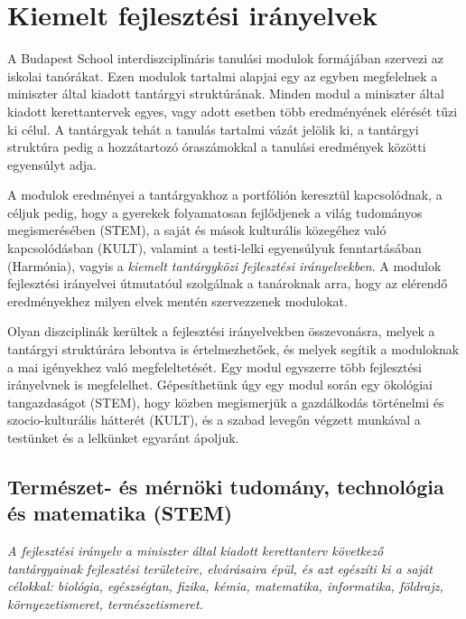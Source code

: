\section{Kiemelt fejlesztési irányelvek}
\label{sec:kiemelt_fejlesztesi_iranyelvek}
A Budapest School interdiszciplináris tanulási modulok formájában szervezi az iskolai tanórákat. Ezen modulok tartalmi alapjai egy az egyben megfelelnek a miniszter által kiadott tantárgyi struktúrának. Minden modul a miniszter által kiadott kerettantervek egyes, vagy adott esetben több eredményének elérését tűzi ki célul. A tantárgyak tehát a tanulás tartalmi vázát jelölik ki, a tantárgyi struktúra pedig a hozzátartozó óraszámokkal a tanulási eredmények közötti egyensúlyt adja. 

A modulok eredményei a tantárgyakhoz a portfólión keresztül kapcsolódnak, a céljuk pedig, hogy a gyerekek folyamatosan fejlődjenek a világ tudományos megismerésében (STEM), a saját és mások kulturális közegéhez való kapcsolódásban (KULT), valamint a testi-lelki egyensúlyuk fenntartásában (Harmónia), vagyis a \emph{kiemelt tantárgyközi fejlesztési irányelvekben}. A modulok fejlesztési irányelvei útmutatóul szolgálnak a tanároknak arra, hogy az elérendő eredményekhez milyen elvek mentén szervezzenek modulokat. 

Olyan diszciplinák kerültek a fejlesztési irányelvekben összevonásra, melyek a tantárgyi struktúrára lebontva is értelmezhetőek, és melyek segítik a moduloknak a mai igényekhez való megfeleltetését. Egy modul egyszerre több fejlesztési irányelvnek is megfelelhet. Gépesíthetünk úgy egy modul során egy ökológiai tangazdaságot (STEM), hogy közben megismerjük a gazdálkodás történelmi és szocio-kulturális hátterét (KULT), és a szabad levegőn végzett munkával a testünket és a lelkünket egyaránt ápoljuk.   


\subsection[STEM]{Természet- és mérnöki	tudomány, technológia és matematika	(STEM)}
\emph{A fejlesztési irányelv a miniszter által kiadott kerettanterv következő tantárgyainak fejlesztési területeire, elvárásaira épül, és azt egészíti ki a saját célokkal: biológia, egészségtan, fizika, kémia, matematika, informatika, földrajz, környezetismeret, természetismeret.}

